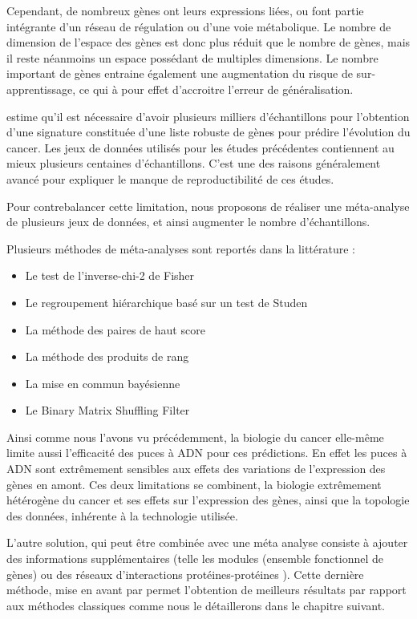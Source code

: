 			Cependant, de nombreux gènes ont leurs expressions liées, ou font partie intégrante d'un réseau de régulation ou d'une voie métabolique.
			Le nombre de dimension de l'espace des gènes est donc plus réduit que le nombre de gènes, mais il reste néanmoins un espace possédant de multiples dimensions.
			Le nombre important de gènes entraine également une augmentation du risque de sur-apprentissage, ce qui à pour effet d'accroitre l'erreur de généralisation.

			\citeauthor{EinDor2006} estime qu'il est nécessaire d'avoir plusieurs milliers d'échantillons pour l'obtention d'une signature constituée d'une liste robuste de gènes pour prédire l'évolution du cancer.
			Les jeux de données utilisés pour les études précédentes \citep{vandevijver2002,Wang2005} contiennent au mieux plusieurs centaines d'échantillons.
			C'est une des raisons généralement avancé pour expliquer le manque de reproductibilité de ces études.

			Pour contrebalancer cette limitation, nous proposons de réaliser une méta-analyse de plusieurs jeux de données, et ainsi augmenter le nombre d'échantillons.

			Plusieurs méthodes de méta-analyses sont reportés dans la littérature :
			\begin{itemize}
				\item Le test de l'inverse-chi-2 de Fisher \citep{Fisher1925}
				\item Le regroupement hiérarchique basé sur un test de Studen \citep{Gentleman2004}
				\item La méthode des paires de haut score \citep{Xu2005}
				\item La méthode des produits de rang \citep{Hong2006}
				\item La mise en commun bayésienne \citep{Conlon2006}
				\item Le Binary Matrix Shuffling Filter \citep{Zhang2012e}
			\end{itemize}

			Ainsi comme nous l'avons vu précédemment, la biologie du cancer elle-même limite aussi l'efficacité des puces à \acs{ADN} pour ces prédictions.
			En effet les puces à \acs{ADN} sont extrêmement sensibles aux effets des variations de l'expression des gènes en amont.
			Ces deux limitations se combinent, la biologie extrêmement hétérogène du cancer et ses effets sur l'expression des gènes, ainsi que la topologie des données, inhérente à la technologie utilisée.

			L'autre solution, qui peut être combinée avec une méta analyse consiste à ajouter des informations supplémentaires (telle les modules (ensemble fonctionnel de gènes) \citep{VanVliet2007} ou des réseaux d'interactions protéines-protéines \citep{Chuang2007}).
			Cette dernière méthode, mise en avant par \citeauthor{Chuang2007} permet l'obtention de meilleurs résultats par rapport aux méthodes classiques comme nous le détaillerons dans le chapitre suivant.

